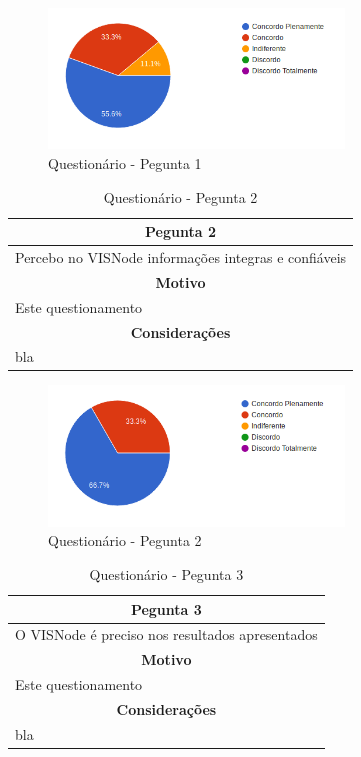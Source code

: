 \documentclass[
	12pt,				%
	oneside,			%
	a4paper,			%
	english,			%
	french,				%
	spanish,			%
	brazil,				%
	]{abntex2}
\begin{document}
\begin{figure}[H]
\centering
\caption{Questionário - Pegunta 1}
\includegraphics[width=0.7\textwidth]{imagens/v1/p1.png}
\sourceAuthor
\end{figure}

\begin{table}[H]
\centering
\caption{Questionário - Pegunta 2} 
\def\arraystretch{1.5}
\begin{tabular}{l}
\hline
\multicolumn{1}{c}{\textbf{Pegunta 2}}              \\ \hline
Percebo no VISNode informações integras e confiáveis \\ \hline
\multicolumn{1}{c}{\textbf{Motivo}}                 \\ \hline
Este questionamento                                   \\ \hline
\multicolumn{1}{c}{\textbf{Considerações}}          \\ \hline
bla                                                   \\ \hline
\end{tabular}
\sourceAuthor
\end{table}

\begin{figure}[H]
\centering
\caption{Questionário - Pegunta 2}
\includegraphics[width=0.7\textwidth]{imagens/v1/p2.png}
\sourceAuthor
\end{figure}

\begin{table}[H]
\centering
\caption{Questionário - Pegunta 3} 
\def\arraystretch{1.5}
\begin{tabular}{l}
\hline
\multicolumn{1}{c}{\textbf{Pegunta 3}}              \\ \hline
O VISNode é preciso nos resultados apresentados \\ \hline
\multicolumn{1}{c}{\textbf{Motivo}}                 \\ \hline
Este questionamento                                   \\ \hline
\multicolumn{1}{c}{\textbf{Considerações}}          \\ \hline
bla                                                   \\ \hline
\end{tabular}
\sourceAuthor
\end{table}
\end{document}
